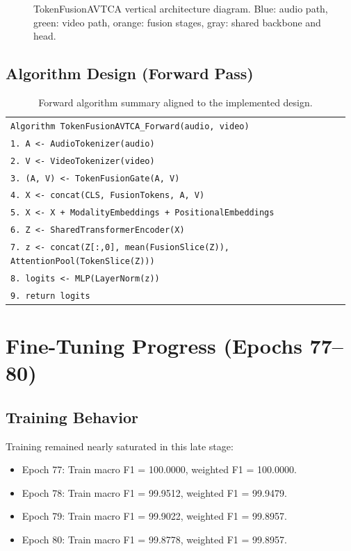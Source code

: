 \documentclass[11pt]{article}
\begin{document}
\begin{figure}[H]
\caption{TokenFusionAVTCA vertical architecture diagram. Blue: audio path, green: video path, orange: fusion stages, gray: shared backbone and head.}
\end{figure}

\subsection{Algorithm Design (Forward Pass)}
\begin{table}[H]
\centering
\begin{tabular}{p{0.97\linewidth}}
\toprule
\texttt{Algorithm TokenFusionAVTCA\_Forward(audio, video)} \\
\texttt{1. A <- AudioTokenizer(audio)} \\
\texttt{2. V <- VideoTokenizer(video)} \\
\texttt{3. (A, V) <- TokenFusionGate(A, V)} \\
\texttt{4. X <- concat(CLS, FusionTokens, A, V)} \\
\texttt{5. X <- X + ModalityEmbeddings + PositionalEmbeddings} \\
\texttt{6. Z <- SharedTransformerEncoder(X)} \\
\texttt{7. z <- concat(Z[:,0], mean(FusionSlice(Z)), AttentionPool(TokenSlice(Z)))} \\
\texttt{8. logits <- MLP(LayerNorm(z))} \\
\texttt{9. return logits} \\
\bottomrule
\end{tabular}
\caption{Forward algorithm summary aligned to the implemented design.}
\end{table}

\section{Fine-Tuning Progress (Epochs 77--80)}
\subsection{Training Behavior}
Training remained nearly saturated in this late stage:
\begin{itemize}
  \item Epoch 77: Train macro F1 = 100.0000, weighted F1 = 100.0000.
  \item Epoch 78: Train macro F1 = 99.9512, weighted F1 = 99.9479.
  \item Epoch 79: Train macro F1 = 99.9022, weighted F1 = 99.8957.
  \item Epoch 80: Train macro F1 = 99.8778, weighted F1 = 99.8957.
\end{itemize}
\end{document}
